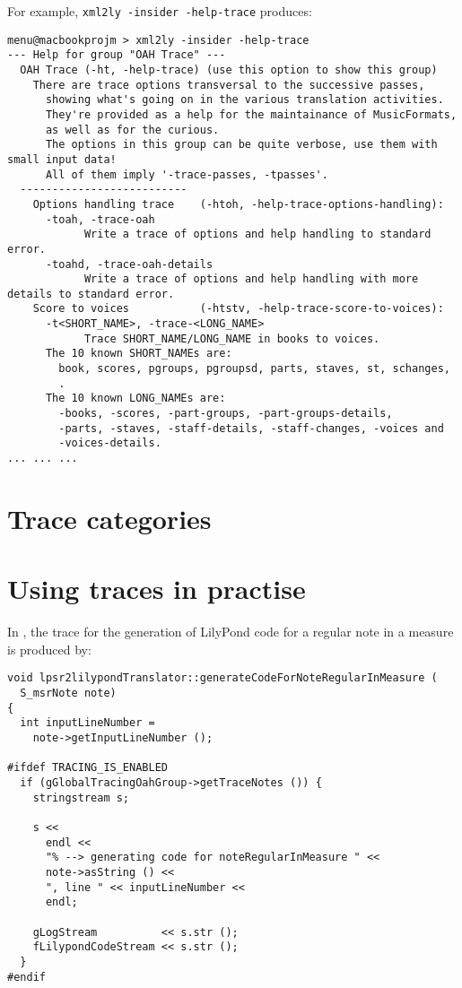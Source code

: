 For example, {\tt xml2ly -insider -help-trace} produces:
\begin{lstlisting}[language=Terminal]
menu@macbookprojm > xml2ly -insider -help-trace
--- Help for group "OAH Trace" ---
  OAH Trace (-ht, -help-trace) (use this option to show this group)
    There are trace options transversal to the successive passes,
      showing what's going on in the various translation activities.
      They're provided as a help for the maintainance of MusicFormats,
      as well as for the curious.
      The options in this group can be quite verbose, use them with small input data!
      All of them imply '-trace-passes, -tpasses'.
  --------------------------
    Options handling trace    (-htoh, -help-trace-options-handling):
      -toah, -trace-oah
            Write a trace of options and help handling to standard error.
      -toahd, -trace-oah-details
            Write a trace of options and help handling with more details to standard error.
    Score to voices           (-htstv, -help-trace-score-to-voices):
      -t<SHORT_NAME>, -trace-<LONG_NAME>
            Trace SHORT_NAME/LONG_NAME in books to voices.
      The 10 known SHORT_NAMEs are:
        book, scores, pgroups, pgroupsd, parts, staves, st, schanges,
        .
      The 10 known LONG_NAMEs are:
        -books, -scores, -part-groups, -part-groups-details,
        -parts, -staves, -staff-details, -staff-changes, -voices and
        -voices-details.
... ... ...
\end{lstlisting}


\section{Trace categories}

\section{Using traces in practise}

In , the trace for the generation of LilyPond code for a regular note in a measure is produced by:
\begin{lstlisting}[language=CPlusPlus]
void lpsr2lilypondTranslator::generateCodeForNoteRegularInMeasure (
  S_msrNote note)
{
  int inputLineNumber =
    note->getInputLineNumber ();

#ifdef TRACING_IS_ENABLED
  if (gGlobalTracingOahGroup->getTraceNotes ()) {
    stringstream s;

    s <<
      endl <<
      "% --> generating code for noteRegularInMeasure " <<
      note->asString () <<
      ", line " << inputLineNumber <<
      endl;

    gLogStream          << s.str ();
    fLilypondCodeStream << s.str ();
  }
#endif

\end{lstlisting}


